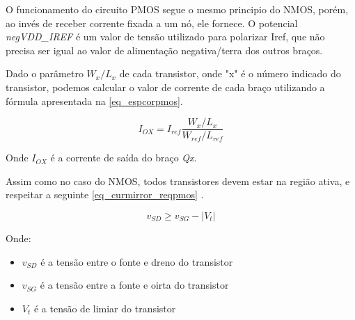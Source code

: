 O funcionamento do circuito PMOS segue o mesmo principio do NMOS, porém, ao inv\'es de receber corrente fixada a um n\'o, ele fornece. O potencial \emph{negVDD\_{IREF}} \'e um valor de tens\~ao utilizado para polarizar Iref, que n\~ao precisa ser igual ao valor de alimenta{\c c}\~ao negativa/terra dos outros bra{\c c}os.

Dado o parâmetro $W_x/L_x$ de cada transistor, onde "x" é o número indicado do transistor, podemos calcular o valor de corrente de cada braço utilizando a fórmula apresentada na \autoref{eq_espcorpmos}.

\begin{equation}
    \label{eq_espcorpmos}
    I_{OX} = I_{ref}\frac{W_x/L_x}{W_{ref}/L_{ref}}
\end{equation}

Onde $I_{OX}$ \'e a corrente de sa\'ida do bra{\c c}o \emph{Qx}. 

Assim como no caso do NMOS, todos transistores devem estar na regi\~ao ativa, e respeitar a seguinte \autoref{eq_curmirror_reqpmos} \cite{RazaviFundM}.

\begin{equation}
    \label{eq_curmirror_reqpmos}
    v_{SD} \geq v_{SG} - |V_t|
\end{equation}

Onde:

\begin{itemize}
    \item $v_{SD}$ \'e a tens\~ao entre o fonte e dreno do transistor
    \item $v_{SG}$ \'e a tens\~ao entre a fonte e oirta do transistor
    \item $V_{t}$ \'e a tens\~ao de limiar do transistor
\end{itemize}

